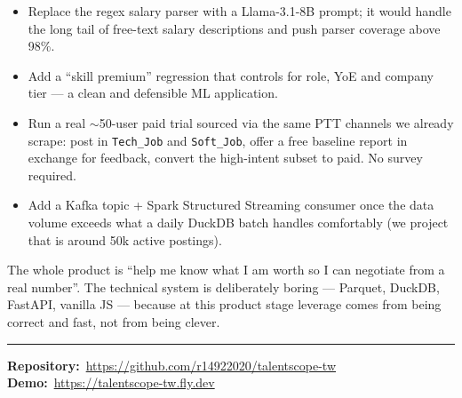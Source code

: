 \documentclass[11pt,a4paper]{article}
\begin{document}
\begin{itemize}[leftmargin=*,itemsep=0.1em,topsep=0.2em]
  \item Replace the regex salary parser with a Llama-3.1-8B prompt; it
    would handle the long tail of free-text salary descriptions and push
    parser coverage above 98\%.
  \item Add a ``skill premium'' regression that controls for role, YoE
    and company tier --- a clean and defensible ML application.
  \item Run a real $\sim$50-user paid trial sourced via the same PTT
    channels we already scrape: post in \texttt{Tech\_Job} and
    \texttt{Soft\_Job}, offer a free baseline report in exchange for
    feedback, convert the high-intent subset to paid. No survey
    required.
  \item Add a Kafka topic + Spark Structured Streaming consumer once the
    data volume exceeds what a daily DuckDB batch handles comfortably
    (we project that is around 50k active postings).
\end{itemize}

The whole product is ``help me know what I am worth so I can negotiate
from a real number''. The technical system is deliberately boring ---
Parquet, DuckDB, FastAPI, vanilla JS --- because at this product stage
leverage comes from being correct and fast, not from being clever.

\vspace{1em}
\hrule\vspace{0.5em}
\small
\textbf{Repository:}\ \url{https://github.com/r14922020/talentscope-tw}
\quad \textbf{Demo:}\ \url{https://talentscope-tw.fly.dev}
\end{document}
